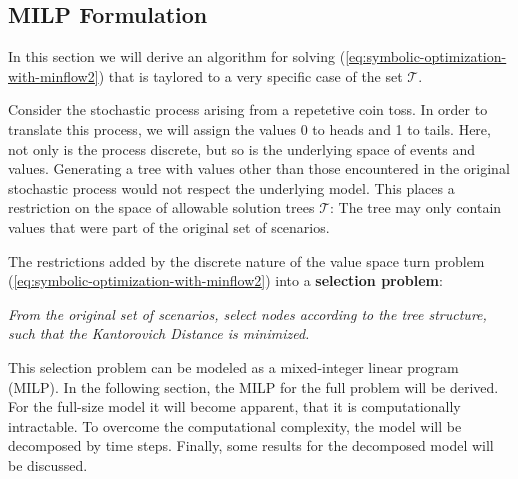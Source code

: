 \documentclass[a4paper, 12pt] {article}
\begin{document}
\subsection{MILP Formulation}
\label{sec:MILP-selection-problem}
In this section we will derive an algorithm for solving (\ref{eq:symbolic-optimization-with-minflow2}) that is taylored to a very specific case of the set $\mathcal{T}$.

Consider the stochastic process arising from a repetetive coin toss. In order to translate this process, we will assign the values 0 to heads and 1 to tails. Here, not only is the process discrete, but so is the underlying space of events and values. Generating a tree with values other than those encountered in the original stochastic process would not respect the underlying model. This places a restriction on the space of allowable solution trees $\mathcal{T}$: The tree may only contain values that were part of the original set of scenarios.

The restrictions added by the discrete nature of the value space turn problem (\ref{eq:symbolic-optimization-with-minflow2}) into a \textbf{selection problem}:
\begin{center}
  \textit{From the original set of scenarios, select nodes according to the tree structure, such that the Kantorovich Distance is minimized.}
\end{center}
This selection problem can be modeled as a mixed-integer linear program (MILP). In the following section, the MILP for the full problem will be derived. For the full-size model it will become apparent, that it is computationally intractable. To overcome the computational complexity, the model will be decomposed by time steps. Finally, some results for the decomposed model will be discussed.
\end{document}

